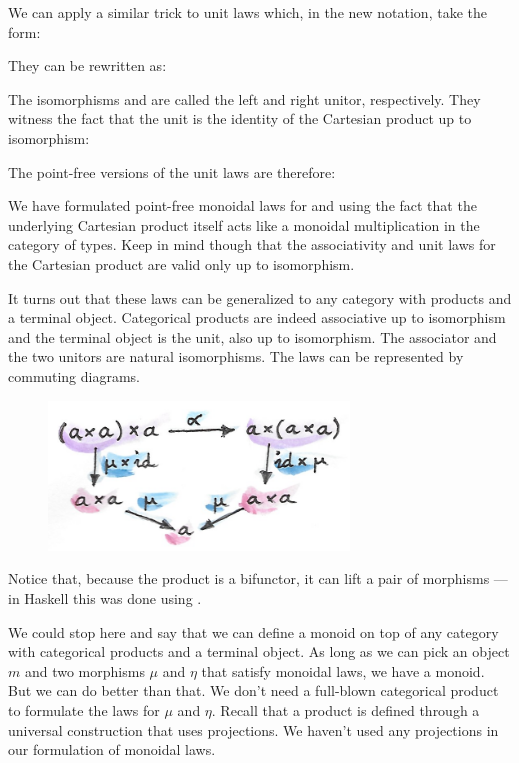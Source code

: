 We can apply a similar trick to unit laws which, in the new notation,
take the form:

They can be rewritten as:

The isomorphisms  and  are called the left
and right unitor, respectively. They witness the fact that the unit
\code{()} is the identity of the Cartesian product up to isomorphism:


The point-free versions of the unit laws are therefore:

We have formulated point-free monoidal laws for  and
 using the fact that the underlying Cartesian product itself
acts like a monoidal multiplication in the category of types. Keep in
mind though that the associativity and unit laws for the Cartesian
product are valid only up to isomorphism.

It turns out that these laws can be generalized to any category with
products and a terminal object. Categorical products are indeed
associative up to isomorphism and the terminal object is the unit, also
up to isomorphism. The associator and the two unitors are natural
isomorphisms. The laws can be represented by commuting diagrams.

\begin{figure}[H]
\centering
\includegraphics[width=80mm]{images/assocmon.png}
\end{figure}

\noindent
Notice that, because the product is a bifunctor, it can lift a pair of
morphisms --- in Haskell this was done using .

We could stop here and say that we can define a monoid on top of any
category with categorical products and a terminal object. As long as we
can pick an object $m$ and two morphisms $\mu$ and $\eta$ that satisfy
monoidal laws, we have a monoid. But we can do better than that. We
don't need a full-blown categorical product to formulate the laws for $\mu$
and $\eta$. Recall that a product is defined through a universal construction
that uses projections. We haven't used any projections in our
formulation of monoidal laws.

